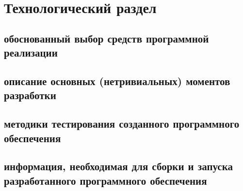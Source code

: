 \chapter{Технологический раздел}


\section{обоснованный выбор средств программной реализации}
\section{описание основных (нетривиальных) моментов разработки}
\section{методики тестирования созданного программного обеспечения}
\section{информация, необходимая для сборки и запуска разработанного программного обеспечения}